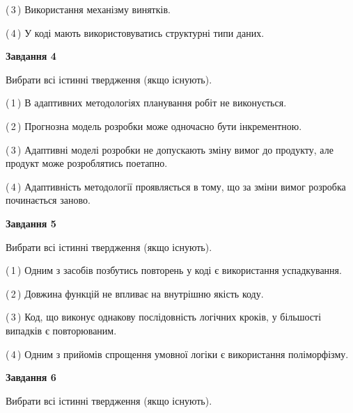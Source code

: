\documentclass[10pt, ukrainian]{article}
\begin{document}
{\begin {large}
(\,3\,) Використання механізму винятків. %



(\,4\,) У коді мають використовуватись структурні типи даних. %


{\begin {center}\textbf{Завдання 4}\end {center}}\par
Вибрати всі істинні твердження (якщо існують).\par
\vspace{2mm}



(\,1\,) В адаптивних методологіях планування робіт не виконується. %



(\,2\,) Прогнозна модель розробки може одночасно бути інкрементною. %



(\,3\,) Адаптивні моделі розробки не допускають зміну вимог до продукту, але продукт може розроблятись поетапно. %



(\,4\,) Адаптивність методології проявляється в тому, що за зміни вимог розробка починається заново. %


{\begin {center}\textbf{Завдання 5}\end {center}}\par
Вибрати всі істинні твердження (якщо існують).\par
\vspace{2mm}



(\,1\,) Одним з засобів позбутись повторень у коді є використання успадкування. %



(\,2\,) Довжина функцій не впливає на внутрішню якість коду. %



(\,3\,) Код, що виконує однакову послідовність логічних кроків, у більшості випадків є повторюваним.%



(\,4\,) Одним з прийомів спрощення умовної логіки є використання поліморфізму. %

\newpage

{\begin {center}\textbf{Завдання 6}\end {center}}\par
Вибрати всі істинні твердження (якщо існують).\par
\vspace{2mm}




\end{large}}
\end{document}
